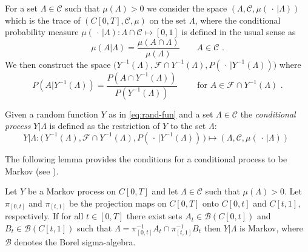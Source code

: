 For a set $ \Lambda \in \mathscr C $ such that $ \mu(\Lambda) > 0 $  we consider the space 
$
( \Lambda,  \mathscr C, \mu(\,\cdot \, | \Lambda ))
$
%
which is the trace of $ (C[0,T], \mathscr C, \mu) $ on the set $ \Lambda $,  where 
the conditional  probability measure $  \mu(\,\cdot \, | \Lambda ) : \Lambda \cap \mathscr C \mapsto [0,1]  $
is defined in the usual sense as
%
\begin{equation}
\mu(A  | \Lambda )= \frac{\mu(A \cap \Lambda )}{\mu(\Lambda)} \qquad A \in  \mathscr C \,\, .
\end{equation}
%
%
We then construct the space 
$
\big ( Y^{-1} (\Lambda),\mathscr F \cap  Y^{-1} (\Lambda), P ( \,\cdot \, | Y^{-1}(\Lambda) ) \big )
$
where
%
%
\begin{equation}
	P ( A | Y^{-1}(\Lambda) ) = \frac{P(A \cap Y^{-1} (\Lambda ) )}{P(Y^{-1} (\Lambda ) )} \qquad 
	\text{ for } A 
	\in \mathscr  F \cap  Y^{-1} (\Lambda) \,\, .
\end{equation}
%
\begin{definition}
	Given a random function $ Y  $ as in \eqref{eq:rand-fun} and a set $ \Lambda \in \mathscr C $ the \emph{conditional process} $ Y| \Lambda $ is defined  
	as the restriction of $ Y $ to the set $ \Lambda $:
	\begin{equation}
	Y|\Lambda : 
	\big (
	\,  Y^{-1} (\Lambda), \mathscr F  \cap  Y^{-1} (\Lambda), P (\, \cdot \,  | {Y^{-1}(\Lambda)} )  \, \big )
	\mapsto
	( \Lambda, \mathscr C, \mu(\, \cdot \,| \Lambda )  ) \,\, 
	\end{equation} 
\end{definition}
%
%


%
%


The following lemma provides the conditions for a conditional process to be Markov (see \cite{durrett77}). 

\begin{lemma}\label{lem:markov-cond}
	Let $ Y $ be a Markov process on $ C[0,T] $ and let $ \Lambda \in \mathscr C $ such that $ \mu(\Lambda) > 0 $. 
	Let $ \pi_{[0,t]} $ and  $ \pi_{[t,1]} $ be the projection maps on $ C[0,T] $ onto  $ C[0,t] $ and 
	 $ C[t,1] $, respectively. If for all $ t \in [0,T] $ there exist sets $ A_t \in \mathscr B(C[0,t] )$ and $ B_t \in \mathscr B(C[t,1] ) $ such that 
	 $ \Lambda   =   \pi_{[0,t]} ^{-1} A_t  \cap \pi_{[t,1]} ^{-1} B_t$ then $ Y|\Lambda  $ is Markov, 
	 where $ \mathscr B $ denotes the Borel sigma-algebra. 
\end{lemma}


